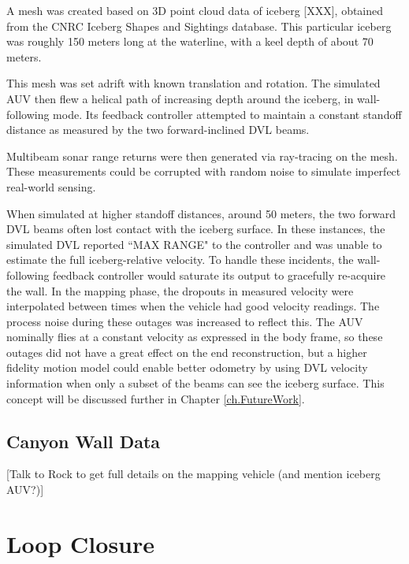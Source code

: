 A mesh was created based on 3D point cloud data of iceberg [XXX], obtained from the CNRC Iceberg Shapes and Sightings database. \cite{?} This particular iceberg was roughly 150 meters long at the waterline, with a keel depth of about 70 meters.

This mesh was set adrift with known translation and rotation. The simulated AUV then flew a helical path of increasing depth around the iceberg, in wall-following mode. Its feedback controller attempted to maintain a constant standoff distance as measured by the two forward-inclined DVL beams.

Multibeam sonar range returns were then generated via ray-tracing on the mesh. These measurements could be corrupted with random noise to simulate imperfect real-world sensing. 

When simulated at higher standoff distances, around 50 meters, the two forward DVL beams often lost contact with the iceberg surface. In these instances, the simulated DVL reported ``MAX RANGE" to the controller and was unable to estimate the full iceberg-relative velocity. To handle these incidents, the wall-following feedback controller would saturate its output to gracefully re-acquire the wall. In the mapping phase, the dropouts in measured velocity were interpolated between times when the vehicle had good velocity readings. The process noise during these outages was increased to reflect this. The AUV nominally flies at a constant velocity as expressed in the body frame, so these outages did not have a great effect on the end reconstruction, but a higher fidelity motion model could enable better odometry by using DVL velocity information when only a subset of the beams can see the iceberg surface. This concept will be discussed further in Chapter \ref{ch.FutureWork}.

\subsection{Canyon Wall Data}

[Talk to Rock to get full details on the mapping vehicle (and mention iceberg AUV?)]

\section{Loop Closure}

